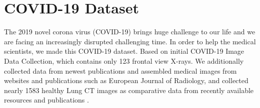 \section{COVID-19 Dataset} %
\label{sub:amet}

The 2019 novel corona virus (COVID-19) brings huge challenge to our life and we are facing an increasingly disrupted challenging time. In order to help the medical scientists, we made this COVID-19 dataset. Based on initial COVID-19 Image Data Collection\cite{b37}, which contains only 123 frontal view X-rays. We additionally collected data from newest publications and  assembled medical images from websites and publications such as European Journal of Radiology\cite{b36}, and collected nearly 1583 healthy Lung CT images as comparative data from recently available resources and publications\cite{b37} \cite{b38}.

